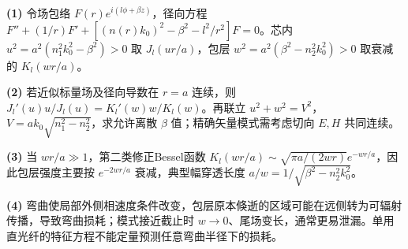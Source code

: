 \par\noindent\textbf{(1)} 令场包络 \(F(r)e^{i(l\phi+\beta z)}\)，径向方程 \(F''+(1/r)F'+[(n(r)k_0)^2-\beta^2-l^2/r^2]F=0\)。芯内 \(u^2=a^2(n_1^2k_0^2-\beta^2)>0\) 取 \(J_l(ur/a)\)，包层 \(w^2=a^2(\beta^2-n_2^2k_0^2)>0\) 取衰减的 \(K_l(wr/a)\)。
\par\noindent\textbf{(2)} 若近似标量场及径向导数在 \(r=a\) 连续，则 \(J_l'(u)u/J_l(u)=K_l'(w)w/K_l(w)\)。再联立 \(u^2+w^2=V^2\)，\(V=ak_0\sqrt{n_1^2-n_2^2}\)，求允许离散 \(\beta\) 值；精确矢量模式需考虑切向 \(E,H\) 共同连续。
\par\noindent\textbf{(3)} 当 \(wr/a\gg1\)，第二类修正Bessel函数 \(K_l(wr/a)\sim\sqrt{\pi a/(2wr)}e^{-wr/a}\)，因此包层强度主要按 \(e^{-2wr/a}\) 衰减，典型幅穿透长度 \(a/w=1/\sqrt{\beta^2-n_2^2k_0^2}\)。
\par\noindent\textbf{(4)} 弯曲使局部外侧相速度条件改变，包层原本倏逝的区域可能在远侧转为可辐射传播，导致弯曲损耗；模式接近截止时 \(w\to0\)、尾场变长，通常更易泄漏。单用直光纤的特征方程不能定量预测任意弯曲半径下的损耗。
